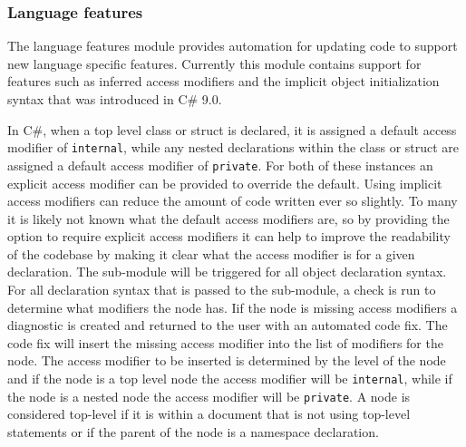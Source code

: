 \subsubsection{Language features}
The language features module provides automation for updating code to support new language specific features. Currently this module contains support for features such as inferred access modifiers and the implicit object initialization syntax that was introduced in C\# 9.0.

In C\#, when a top level class or struct is declared, it is assigned a default access modifier of \texttt{internal}, while any nested declarations within the class or struct are assigned a default access modifier of \texttt{private}. For both of these instances an explicit access modifier can be provided to override the default. Using implicit access modifiers can reduce the amount of code written ever so slightly. To many it is likely not known what the default access modifiers are, so by providing the option to require explicit access modifiers it can help to improve the readability of the codebase by making it clear what the access modifier is for a given declaration.
The sub-module will be triggered for all object declaration syntax. For all declaration syntax that is passed to the sub-module, a check is run to determine what modifiers the node has. Iif the node is missing access modifiers a diagnostic is created and returned to the user with an automated code fix. The code fix will insert the missing access modifier into the list of modifiers for the node. The access modifier to be inserted is determined by the level of the node and if the node is a top level node the access modifier will be \texttt{internal}, while if the node is a nested node the access modifier will be \texttt{private}. A node is considered top-level if it is within a document that is not using top-level statements or if the parent of the node is a namespace declaration.

